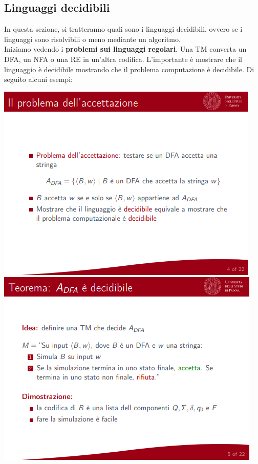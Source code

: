 \documentclass[]{article}
\begin{document}
		\subsection{Linguaggi decidibili}
			In questa sezione, si tratteranno quali sono i linguaggi decidibili, ovvero se i linguaggi sono risolvibili o meno mediante un algoritmo.\\
			Iniziamo vedendo i \textbf{problemi sui linguaggi regolari}. Una TM converta un DFA, un NFA o una RE in un'altra codifica. L'importante è mostrare che il linguaggio è decidibile mostrando che il problema computazione è decidibile. Di seguito alcuni esempi:
			\begin{center}
				\includegraphics[scale=0.8]{problemaRegolare1.png}
				\includegraphics[scale=0.8]{problemaRegolare2.png}

\end{center}
\end{document}
